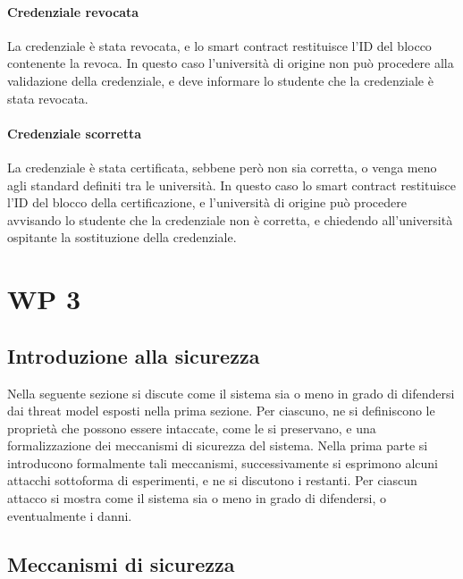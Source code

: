 \documentclass[a4paper,12pt]{article}
\begin{document}
\paragraph{Credenziale revocata} La credenziale è stata revocata, e lo smart contract restituisce l'ID del blocco contenente la revoca. In questo caso l'università di origine non può procedere alla validazione della credenziale, e deve informare lo studente che la credenziale è stata revocata.
\paragraph{Credenziale scorretta} La credenziale è stata certificata, sebbene però non sia corretta, o venga meno agli standard definiti tra le università. In questo caso lo smart contract restituisce l'ID del blocco della certificazione, e l'università di origine può procedere avvisando lo studente che la credenziale non è corretta, e chiedendo all'università ospitante la sostituzione della credenziale.

\newpage
\section{WP 3}
\subsection{Introduzione alla sicurezza}
Nella seguente sezione si discute come il sistema sia o meno in grado di difendersi dai threat model esposti nella prima sezione. Per ciascuno, ne si definiscono le proprietà che possono essere intaccate, come le si preservano, e una formalizzazione dei meccanismi di sicurezza del sistema.
\newline Nella prima parte si introducono formalmente tali meccanismi, successivamente si esprimono alcuni attacchi sottoforma di esperimenti, e ne si discutono i restanti. Per ciascun attacco si mostra come il sistema sia o meno in grado di difendersi, o eventualmente i danni.
\subsection{Meccanismi di sicurezza}
\end{document}
